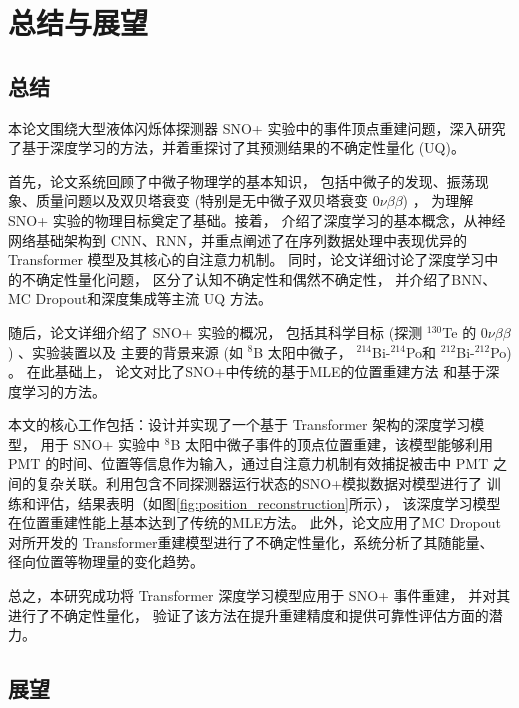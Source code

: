 \chapter{总结与展望}

\section{总结}

本论文围绕大型液体闪烁体探测器 SNO+ 实验中的事件顶点重建问题，深入研究了基于深度学习的方法，并着重探讨了其预测结果的不确定性量化 (UQ)。

首先，论文系统回顾了中微子物理学的基本知识，
包括中微子的发现、振荡现象、质量问题以及双贝塔衰变 
(特别是无中微子双贝塔衰变 $0\nu\beta\beta$) ，
为理解 SNO+ 实验的物理目标奠定了基础。接着，
介绍了深度学习的基本概念，从神经网络基础架构到
CNN、RNN，并重点阐述了在序列数据处理中表现优异的 
Transformer 模型及其核心的自注意力机制。
同时，论文详细讨论了深度学习中的不确定性量化问题，
区分了认知不确定性和偶然不确定性，
并介绍了BNN、MC Dropout和深度集成等主流 UQ 方法。

随后，论文详细介绍了 SNO+ 实验的概况，
包括其科学目标 (探测 ${}^{130}$Te 
的 $0\nu\beta\beta$) 、实验装置以及
主要的背景来源 (如 ${}^{8}$B 太阳中微子，
${}^{214}$Bi-${}^{214}$Po和
${}^{212}$Bi-${}^{212}$Po) 。
在此基础上，
论文对比了SNO+中传统的基于MLE的位置重建方法
和基于深度学习的方法。

本文的核心工作包括：设计并实现了一个基于 Transformer 架构的深度学习模型，
用于 SNO+ 实验中 ${}^{8}$B 太阳中微子事件的顶点位置重建，该模型能够利用 
PMT 的时间、位置等信息作为输入，通过自注意力机制有效捕捉被击中 PMT 
之间的复杂关联。利用包含不同探测器运行状态的SNO+模拟数据对模型进行了
训练和评估，结果表明（如图\ref{fig:position_reconstruction}所示），
该深度学习模型在位置重建性能上基本达到了传统的MLE方法。
此外，论文应用了MC Dropout对所开发的 
Transformer重建模型进行了不确定性量化，系统分析了其随能量、
径向位置等物理量的变化趋势。

总之，本研究成功将 Transformer 深度学习模型应用于 SNO+ 事件重建，
并对其进行了不确定性量化，
验证了该方法在提升重建精度和提供可靠性评估方面的潜力。

\section{展望}

